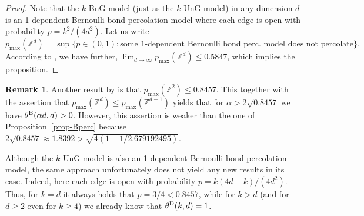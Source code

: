 \documentclass[oneside]{amsart}
\newtheorem{prop}[theorem]{Proposition}
\theoremstyle{definition}
\newtheorem{remark}[theorem]{Remark}
\newcommand{\1}{\mathbbm{1}}
\newcommand{\0}{\mathbf{o}}
\newcommand{\Z}{\mathbb{Z}}
\numberwithin{equation}{section}
\begin{document}
\begin{proof}
Note that the $k$-BnG model (just as the $k$-UnG model) in any dimension $d$ is an 1-dependent Bernoulli bond percolation model where each edge is open with probability $p=k^2/(4d^2)$. Let us write 
\[ p_{\max}(\Z^d)= \sup \{ p \in (0,1) \colon \text{some 1-dependent Bernoulli bond perc.\ model does not percolate} \}. \]
According to \cite{improvedLB}, we have %
further, $\lim_{d\to\infty} p_{\max}(\Z^d) \leq 0.5847$, which implies the proposition.
\end{proof}
\begin{remark}
Another result by \cite{improvedLB} is that $p_{\max}(\Z^2) \leq 0.8457$. This together with the assertion that $p_{\max}(\Z^d) \leq p_{\max}(\Z^{d-1})$ yields that for $\alpha>2\sqrt{0.8457}$ we have $\theta^{\rm B}(\alpha d, d)>0$. However, this assertion is weaker than the one of Proposition~\ref{prop-Bperc} because $2\sqrt{0.8457} \approx 1.8392 > \sqrt{4(1-1/2.679192495)}$. 

Although the $k$-UnG model is also an 1-dependent Bernoulli bond percolation model, the same approach unfortunately does not yield any new results in its case. Indeed, here each edge is open with probability $p=k(4d-k)/(4d^2)$. Thus, for $k=d$ it always holds that $p=3/4<0.8457$, while for $k>d$ (and for $d \geq 2$ even for $k \geq 4$) we already know that $\theta^{\rm D}(k,d)=1$. 
\end{remark}

\end{document}
